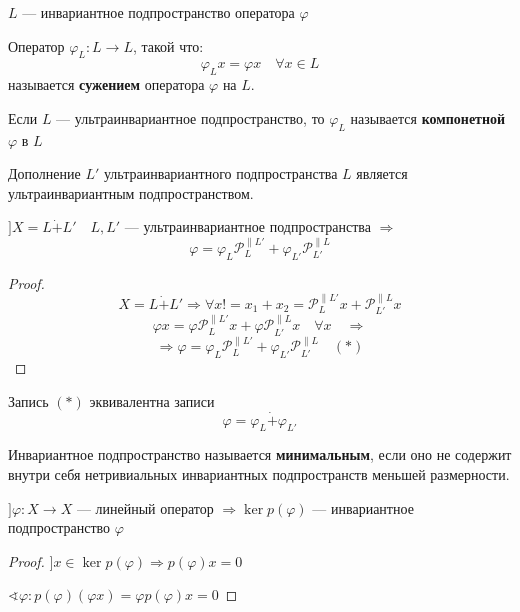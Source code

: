 $L$ --- инвариантное подпространство оператора $\varphi$

\begin{definition}
    Оператор $\varphi_L : L\to L$, такой что:
    $$\varphi_L x =\varphi x \quad \forall x\in L$$
    называется \textbf{сужением} оператора $\varphi$ на $L$.

    Если $L$ --- ультраинвариантное подпространство, то $\varphi_L$ называется \textbf{компонетной} $\varphi$ в $L$ 
\end{definition}

\begin{lemma}
    Дополнение $L'$ ультраинвариантного подпространства $L$ является ультраинвариантным подпространством.
\end{lemma}
\begin{lemma}
    $] X = L \dot+ L' \quad L,L'$ --- ультраинвариантное подпространства $\Rightarrow$
    $$\varphi = \varphi_L \mathcal P_L^{\parallel L'} + \varphi_{L'} \mathcal P_{L'}^{\parallel L}$$
\end{lemma}
\begin{proof}
    $$X = L \dot+ L' \Rightarrow \forall x! = x_1+x_2 = \mathcal P_L^{\parallel L'} x + \mathcal P_{L'}^{\parallel L} x$$
    $$\varphi x = \varphi \mathcal P_L^{\parallel L'} x + \varphi \mathcal P_{L'}^{\parallel L} x \quad \forall x \quad \Rightarrow$$
    $$\Rightarrow \varphi=\varphi_L \mathcal P_L^{\parallel L'} + \varphi_{L'} \mathcal P_{L'}^{\parallel L} \quad (*)$$
\end{proof}

\begin{remark}
    Запись $(*)$ эквивалентна записи
    $$\varphi = \varphi_L \dot+ \varphi_{L'}$$
\end{remark}

\begin{definition}
    Инвариантное подпространство называется \textbf{минимальным}, если оно не содержит внутри себя нетривиальных инвариантных подпространств меньшей размерности.
\end{definition}

\begin{lemma}
    $] \varphi : X \to X$ --- линейный оператор $\Rightarrow \ker p(\varphi)$ --- инвариантное подпространство $\varphi$
\end{lemma}
\begin{proof}
    $] x\in \ker p(\varphi) \Rightarrow p(\varphi) x = 0$

    $\sphericalangle \varphi : p(\varphi)(\varphi x) = \varphi p(\varphi) x = 0$
\end{proof}

